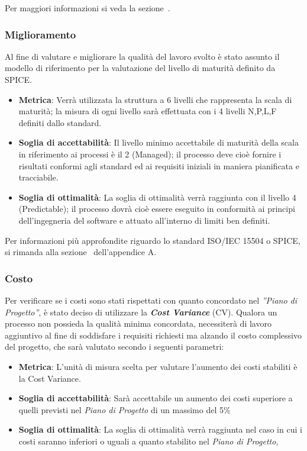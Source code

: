 Per maggiori informazioni si veda la sezione~.

\subsubsection{Miglioramento}
Al fine di valutare e migliorare la qualità del lavoro svolto è stato assunto il modello di riferimento per la valutazione del livello di maturità definito da SPICE.
\begin{itemize}
	\item \textbf{Metrica}: Verrà utilizzata la struttura a 6 livelli che rappresenta la scala di maturità; la misura di ogni livello sarà effettuata con i 4 livelli N,P,L,F definiti dallo standard.
	\item \textbf{Soglia di accettabilità}: Il livello minimo accettabile di maturità della scala in riferimento ai processi è il 2 (Managed); il processo deve cioè fornire i risultati conformi agli standard ed ai requisiti iniziali in maniera pianificata e tracciabile.
	\item \textbf{Soglia di ottimalità}: La soglia di ottimalità verrà raggiunta con il livello 4 (Predictable); il processo dovrà cioè essere eseguito in conformità ai principi dell'ingegneria del software e attuato all'interno di limiti ben definiti.
\end{itemize}

Per informazioni più approfondite riguardo lo standard ISO/IEC 15504 o SPICE, si rimanda alla sezione~ dell'appendice A.

\subsubsection{Costo}
Per verificare se i costi sono stati rispettati con quanto concordato nel  \emph{''Piano di Progetto''}, è stato deciso di utilizzare la \emph{\textbf{Cost Variance}} (CV).
Qualora un processo non possieda la qualità minima concordata, necessiterà di lavoro aggiuntivo al fine di soddisfare i requisiti richiesti ma alzando il costo complessivo del progetto, che sarà valutato secondo i seguenti parametri:
\begin{itemize}
	\item \textbf{Metrica}: L'unità di misura scelta per valutare l'aumento dei costi stabiliti è la Cost Variance.
	\item \textbf{Soglia di accettabilità}: Sarà accettabile un aumento dei costi superiore a quelli previsti nel \emph{Piano di Progetto} di un massimo del 5\%
	\item \textbf{Soglia di ottimalità}: La soglia di ottimalità verrà raggiunta nel caso in cui i costi saranno inferiori o uguali a quanto stabilito nel \emph{Piano di Progetto}, 
\end{itemize}

